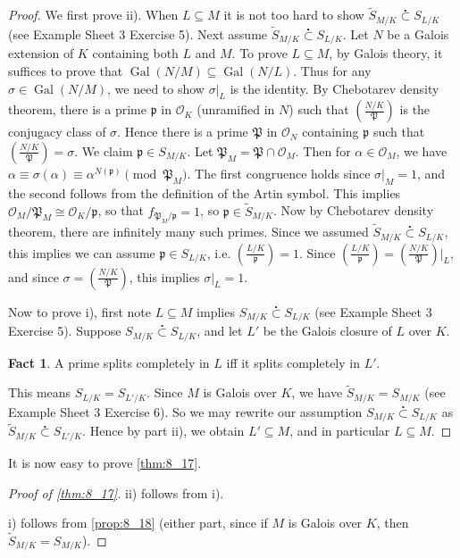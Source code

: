 \documentclass[11pt]{article}
\theoremstyle{definition}
\newtheorem*{fact}{Fact}
\theoremstyle{plain}
\theoremstyle{remark}
\DeclareMathOperator{\Gal}{Gal}
\newcommand{\cO}{\mathcal{O}}
\newcommand{\cp}{\mathfrak{P}}
\newcommand{\fp}{\mathfrak{p}}
\newcommand{\leg}[2]{\left(\frac{#1}{#2}\right)}
\newcommand{\subsetdot}{\stackrel{\centerdot}{\subset}}
\begin{document}
\begin{proof}
    We first prove ii). When $L \subseteq M$ it is not too hard to show $\widetilde{S}_{M/K} \subsetdot S_{L/K}$ (see Example Sheet 3 Exercise 5). Next assume $\widetilde{S}_{M/K} \subsetdot S_{L/K}$. Let $N$ be a Galois extension of $K$ containing both $L$ and $M$. To prove $L \subseteq M$, by Galois theory, it suffices to prove that $\Gal(N/M) \subseteq \Gal(N/L)$. Thus for any $\sigma \in \Gal(N/M)$, we need to show $\sigma \vert_L$ is the identity. By Chebotarev density theorem, there is a prime $\fp$ in $\cO_K$ (unramified in $N$) such that $\leg{N/K}{\cp}$ is the conjugacy class of $\sigma$. Hence there is a prime $\cp$ in $\cO_N$ containing $\fp$ such that $\leg{N/K}{\cp} = \sigma$. We claim $\fp \in S_{M/K}$. Let $\cp_M = \cp \cap \cO_M$. Then for $\alpha \in \cO_M$, we have $\alpha \equiv \sigma(\alpha) \equiv \alpha^{N(\fp)} \pmod{\cp_M}$. The first congruence holds since $\sigma \vert_M = 1$, and the second follows from the definition of the Artin symbol. This implies $\cO_M / \cp_M \cong \cO_K / \fp$, so that $f_{\cp_M / \fp} = 1$, so $\fp \in \widetilde{S}_{M/K}$. Now by Chebotarev density theorem, there are infinitely many such primes. Since we assumed $\widetilde{S}_{M/K} \subsetdot S_{L/K}$, this implies we can assume $\fp \in S_{L/K}$, i.e. $\leg{L/K}{\fp} = 1$. Since $\leg{L/K}{\fp} = \leg{N/K}{\cp} \vert_L$, and since $\sigma = \leg{N/K}{\cp}$, this implies $\sigma \vert_L = 1$.

    Now to prove i), first note $L \subseteq M$ implies $S_{M/K} \subsetdot S_{L/K}$ (see Example Sheet 3 Exercise 5). Suppose $S_{M/K} \subsetdot S_{L/K}$, and let $L'$ be the Galois closure of $L$ over $K$.
    \begin{fact}
        A prime splits completely in $L$ iff it splits completely in $L'$.
    \end{fact}
    This means $S_{L/K} = S_{L'/K}$. Since $M$ is Galois over $K$, we have $\widetilde{S}_{M/K} = S_{M/K}$ (see Example Sheet 3 Exercise 6). So we may rewrite our assumption $S_{M/K} \subsetdot S_{L/K}$ as $\widetilde{S}_{M/K} \subsetdot S_{L'/K}$. Hence by part ii), we obtain $L' \subseteq M$, and in particular $L \subseteq M$.
\end{proof}

It is now easy to prove \autoref{thm:8_17}.
\begin{proof}[Proof of \autoref{thm:8_17}]
    ii) follows from i).

    i) follows from \autoref{prop:8_18} (either part, since if $M$ is Galois over $K$, then $\widetilde{S}_{M/K} = S_{M/K}$).
\end{proof}
\end{document}
